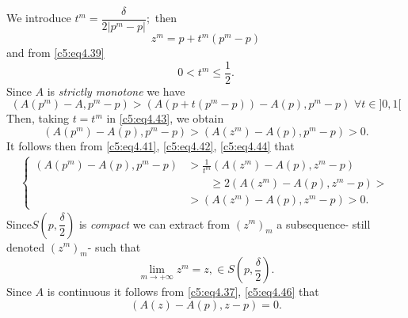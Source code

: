 \begin{figure}[H]
\caption{}\label{c5:fig4.1}
\end{figure}

 We introduce $t^m = \dfrac{\delta}{2 | p^m - p |};$ then 
 \begin{equation}
z^m = p + t^m (p^m - p) \tag{4.41}\label{c5:eq4.41}
  \end{equation} 
  and from \eqref{c5:eq4.39}
  \begin{equation}
0 < t^m \leq \frac{1}{2}. \tag{4.42}\label{c5:eq4.42}
\end{equation}
Since $A$ is \textit{strictly monotone} we have 
\begin{equation}
(A(p^m) - A, p^m - p) > (A (p + t (p^m - p)) - A (p), p^m - p)\,\, \forall
  t \in ]0,1[\tag{4.43}\label{c5:eq4.43} 
\end{equation}  
Then, taking $t = t^m$ in \eqref{c5:eq4.43}, we obtain
\begin{equation}
(A(p^m) - A (p), p^m - p) > (A (z^m) - A (p), p^m -p ) > 0.\tag{4.44}\label{c5:eq4.44}
 \end{equation} 
 It follows then from \eqref{c5:eq4.41}, \eqref{c5:eq4.42}, \eqref{c5:eq4.44} that 
 \begin{align}
\begin{cases}
(A(p^m) - A (p), p^m - p) &> \frac{1}{t^m} (A (z^m) - A (p), z^m -
  p)\\ 
  & \qquad \geq 2(A (z^m) - A (p), z^m - p) >\\
&> (A(z^m) - A (p), z^m - p) > 0.\tag{4.45}\label{c5:eq4.45}
\end{cases}
 \end{align}  
 Since\pageoriginale  $S (p, \dfrac{\delta}{2})$ is \textit{compact }
 we can extract from $(z^m)_m$ a subsequence- still denoted $(z^m)_m$-
 such that  
 \begin{equation}
\lim_{m \to + \infty} z^m = z, \in S(p,
\frac{\delta}{2}).\tag{4.46}\label{c5:eq4.46} 
\end{equation}
Since $A$ is continuous it follows from \eqref{c5:eq4.37},
\eqref{c5:eq4.46} that  
\begin{equation}
(A(z) - A(p), z - p ) = 0. \tag{4.47}\label{c5:eq4.47}
\end{equation}

